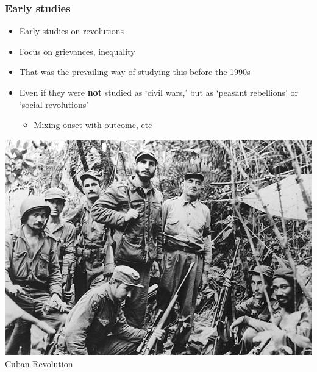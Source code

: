 \documentclass[utf8, xcolor=dvipsnames]{beamer}
\begin{document}
\begin{frame}
\frametitle{Early studies}
\centering

\begin{minipage}{0.59\textwidth}\centering
\begin{itemize}
  \item Early studies on revolutions
  \item Focus on grievances, inequality
  \item That was the prevailing way of studying this before the 1990s
  \item Even if they were \textbf{not} studied as `civil wars,' but as `peasant rebellions' or `social revolutions'
  \begin{itemize}
    \item Mixing onset with outcome, etc
  \end{itemize}
\end{itemize}
\end{minipage}\hfill
\begin{minipage}{0.39\textwidth}\centering
\includegraphics[width = \textwidth]{img/cuban}\\Cuban Revolution
\end{minipage}

\end{frame}
\end{document}
